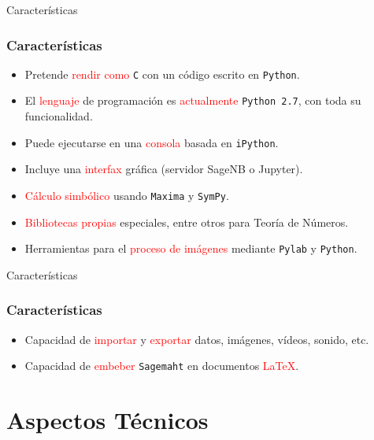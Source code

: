 \documentclass[dvipsnames]{beamer}
\begin{document}
\begin{frame}[fragile]{Características}
  \frametitle{Características}
  \begin{itemize}[<+->]
  \item Pretende \textcolor{red}{rendir como} \texttt{C} con un código
    escrito en \texttt{Python}.
  \item El \textcolor{red}{lenguaje} de programación es
    \textcolor{red}{actualmente} \texttt{Python 2.7}, con toda su
    funcionalidad.
  \item Puede ejecutarse en una \textcolor{red}{consola} basada en
    \texttt{iPython}.
  \item Incluye una \textcolor{red}{interfax} gráfica (servidor SageNB
    o Jupyter).
  \item \textcolor{red}{Cálculo simbólico} usando \texttt{Maxima} y \texttt{SymPy}.
  \item \textcolor{red}{Bibliotecas propias} especiales, entre otros
    para Teoría de Números.
  \item Herramientas para el \textcolor{red}{proceso de imágenes}
    mediante \texttt{Pylab} y \texttt{Python}.
  \end{itemize}
\end{frame}

\begin{frame}[fragile]{Características}
  \frametitle{Características}
  \begin{itemize}[<+->]
  \item Capacidad de \textcolor{red}{importar} y
    \textcolor{red}{exportar} datos, imágenes, vídeos, sonido, etc.
  \item Capacidad de \textcolor{red}{embeber} \texttt{Sagemaht} en
    documentos \textcolor{red}{\LaTeX}.
  \end{itemize}
\end{frame}

\section{Aspectos Técnicos}
\end{document}
